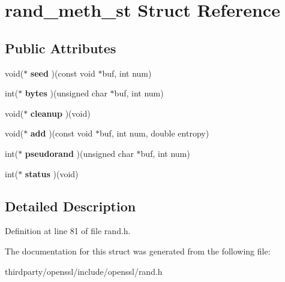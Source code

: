 \hypertarget{structrand__meth__st}{}\section{rand\+\_\+meth\+\_\+st Struct Reference}
\label{structrand__meth__st}
\subsection*{Public Attributes}
\begin{DoxyCompactItemize}
\item 
\mbox{\label{structrand__meth__st_ac5982cb0ac2304a601df7fb009624ec9}} 
void($\ast$ {\bfseries seed} )(const void $\ast$buf, int num)
\item 
\mbox{\label{structrand__meth__st_a41a49e87fa960f2e4f46fec63044ad8d}} 
int($\ast$ {\bfseries bytes} )(unsigned char $\ast$buf, int num)
\item 
\mbox{\label{structrand__meth__st_ab043138ccf85baf2d6f12ab1e5011dff}} 
void($\ast$ {\bfseries cleanup} )(void)
\item 
\mbox{\label{structrand__meth__st_a5587c9d9c28a2abf0136fcc499028f5b}} 
void($\ast$ {\bfseries add} )(const void $\ast$buf, int num, double entropy)
\item 
\mbox{\label{structrand__meth__st_a5e7b24146c610773f7eb0470e54b1408}} 
int($\ast$ {\bfseries pseudorand} )(unsigned char $\ast$buf, int num)
\item 
\mbox{\label{structrand__meth__st_ab7591ea659457fcd115d7dc0a4e54125}} 
int($\ast$ {\bfseries status} )(void)
\end{DoxyCompactItemize}


\subsection{Detailed Description}


Definition at line 81 of file rand.\+h.



The documentation for this struct was generated from the following file\+:\begin{DoxyCompactItemize}
\item 
thirdparty/openssl/include/openssl/rand.\+h\end{DoxyCompactItemize}
